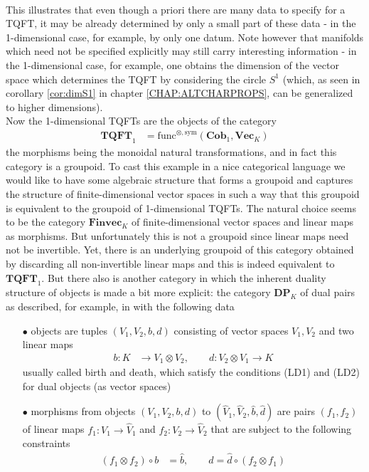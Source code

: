 \\
This illustrates that even though a priori there are many data to specify for a TQFT, it may be already determined by only a small part of these data - in the 1-dimensional case, for example, by only one datum. Note however that manifolds which need not be specified explicitly may still carry interesting information - in the 1-dimensional case, for example, one obtains the dimension of the vector space which determines the TQFT by considering the circle $S^{1}$ (which, as seen in corollary \ref{cor:dimS1} in chapter \ref{CHAP:ALTCHARPROPS}, can be generalized to higher dimensions).
\\
Now the 1-dimensional TQFTs are the objects of the category
\begin{align*}
  \mathbf{TQFT}_{1}
  &=
  \mathrm{func}^{\otimes,\mathrm{sym}}
  \left(
    \mathbf{Cob}_{1}
    ,
    \mathbf{Vec}_{K}
  \right)
\end{align*}
the morphisms being the monoidal natural transformations, and in fact this category is a groupoid. To cast this example in a nice categorical language we would like to have some algebraic structure that forms a groupoid and captures the structure of finite-dimensional vector spaces in such a way that this groupoid is equivalent to the groupoid of 1-dimensional TQFTs. The natural choice seems to be the category $\mathbf{Finvec}_{K}$ of finite-dimensional vector spaces and linear maps as morphisms. But unfortunately this is not a groupoid since linear maps need not be invertible. Yet, there is an underlying groupoid of this category obtained by discarding all non-invertible linear maps and this is indeed equivalent to $\mathbf{TQFT}_{1}$. But there also is another category in which the inherent duality structure of objects is made a bit more explicit: the category $\mathbf{DP}_{K}$ of dual pairs as described, for example, in \cite{0a816f4c} with the following data
\begin{enumerate}
\item[$\bullet$]
objects are tuples $(V_{1},V_{2},b,d)$ consisting of vector spaces $V_{1},V_{2}$ and two linear maps
\begin{align*}
  b
  \colon
  K
  &\to
  V_{1}
  \otimes
  V_{2}
  ,\qquad
  d
  \colon
  V_{2}
  \otimes
  V_{1}
  \to
  K
\end{align*}
usually called {\glqq}birth{\grqq} and {\glqq}death{\grqq}, which satisfy the conditions (LD1) and (LD2) for dual objects (as vector spaces)

\item[$\bullet$]
morphisms from objects $(V_{1},V_{2},b,d)$ to $(\hat{V}_{1},\hat{V}_{2},\hat{b},\hat{d})$ are pairs $(f_{1},f_{2})$ of linear maps $f_{1} \colon V_{1} \to \hat{V}_{1}$ and $f_{2} \colon V_{2} \to \hat{V}_{2}$ that are subject to the following constraints
\begin{align*}
  (f_{1} \otimes f_{2})
  \circ
  b
  &=
  \hat{b}
  ,\qquad
  d
  =
  \hat{d}
  \circ
  (f_{2} \otimes f_{1})
\end{align*}
\end{enumerate}
